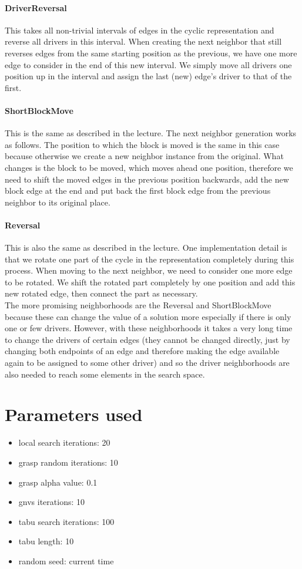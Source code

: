 \documentclass{article}
\begin{document}
\paragraph{DriverReversal}
This takes all non-trivial intervals of edges in the cyclic representation and reverse all drivers in this interval. When creating the next neighbor that still reverses edges from the same starting position as the previous, we have one more edge to consider in the end of this new interval. We simply move all drivers one position up in the interval and assign the last (new) edge's driver to that of the first.
\paragraph{ShortBlockMove}
This is the same as described in the lecture. The next neighbor generation works as follows. The position to which the block is moved is the same in this case because otherwise we create a new neighbor instance from the original. What changes is the block to be moved, which moves ahead one position, therefore we need to shift the moved edges in the previous position backwards, add the new block edge at the end and put back the first block edge from the previous neighbor to its original place.
\paragraph{Reversal}
This is also the same as described in the lecture. One implementation detail is that we rotate one part of the cycle in the representation completely during this process. When moving to the next neighbor, we need to consider one more edge to be rotated. We shift the rotated part completely by one position and add this new rotated edge, then connect the part as necessary.
\medskip\\
The more promising neighborhoods are the Reversal and ShortBlockMove because these can change the value of a solution more especially if there is only one or few drivers. However, with these neighborhoods it takes a very long time to change the drivers of certain edges (they cannot be changed directly, just by changing both endpoints of an edge and therefore making the edge available again to be assigned to some other driver) and so the driver neighborhoods are also needed to reach some elements in the search space.
\section*{Parameters used}
\begin{itemize}
	\item local search iterations: 20
	\item grasp random iterations: 10
	\item grasp alpha value: 0.1
	\item gnvs iterations: 10
	\item tabu search iterations: 100
	\item tabu length: 10
	\item random seed: current time
\end{itemize}
\end{document}
